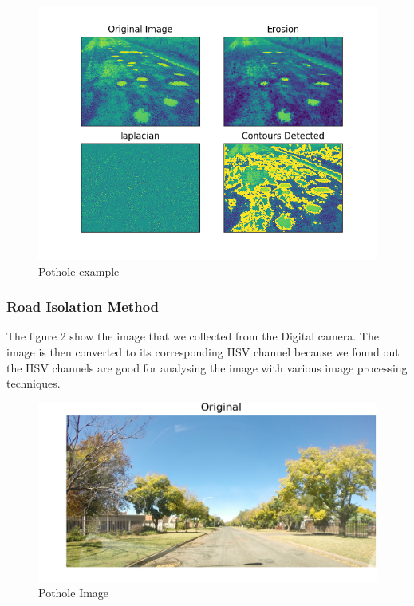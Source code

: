 \documentclass[journal]{IEEEtran}
\begin{document}
\begin{figure}[!h]
\begin{center}
\includegraphics[scale=0.065]{Images/morph_transform_2.png}
\end{center}
\caption{Pothole example}
\end{figure}

\subsubsection{Road Isolation Method}

\noindent The figure 2 show the image that we collected from the Digital camera. The image is then converted to its corresponding HSV channel because we found out the HSV channels are good for analysing the image with various image processing techniques. 

\vspace{0.5cm}

\begin{figure}[!htb]
\begin{center}
\includegraphics[scale=1]{Images/0_Original.png}
\end{center}
\caption{Pothole Image}
\end{figure}
\end{document}

